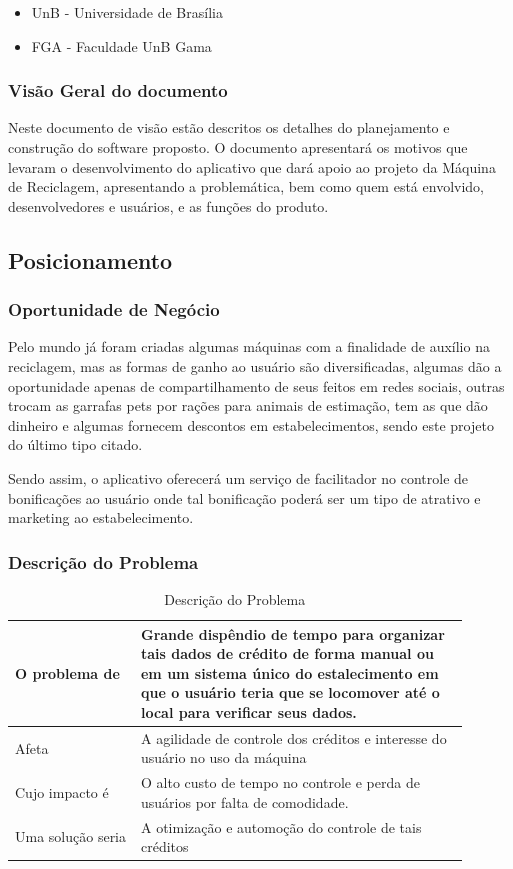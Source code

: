 \begin{itemize}
    \item UnB - Universidade de Brasília
    \item FGA - Faculdade UnB Gama
\end{itemize}

\subsubsection{Visão Geral do documento}
Neste documento de visão estão descritos os detalhes do planejamento e construção do software proposto. O documento apresentará os motivos que levaram o desenvolvimento do aplicativo que dará apoio ao projeto da Máquina de Reciclagem, apresentando a problemática, bem como quem está envolvido, desenvolvedores e usuários, e as funções do produto.

\subsection{Posicionamento}

\subsubsection{Oportunidade de Negócio}
Pelo mundo já foram criadas algumas máquinas com a finalidade de auxílio na reciclagem, mas as formas de ganho ao usuário são diversificadas, algumas dão a oportunidade apenas de compartilhamento de seus feitos em redes sociais, outras trocam as garrafas pets por rações para animais de estimação, tem as que dão dinheiro e algumas fornecem descontos em estabelecimentos, sendo este projeto do último tipo citado.

Sendo assim, o aplicativo oferecerá um serviço de facilitador no controle de bonificações ao usuário onde tal bonificação poderá ser um tipo de atrativo e marketing ao estabelecimento.

\subsubsection{Descrição do Problema}

\begin{table}[htp]
    \centering
    \caption{Descrição do Problema}
    \label{my-label}
    \begin{tabular}{|p{0.25\linewidth}|p{0.65\linewidth}|}
        \hline
        O problema de     & Grande dispêndio de tempo para organizar tais dados de crédito de forma manual ou em um sistema único do estalecimento em que o usuário teria que se locomover até o local para verificar seus dados. \\ \hline
        Afeta             & A agilidade de controle dos créditos e interesse do usuário no uso da máquina \\ \hline
        Cujo impacto é    & O alto custo de tempo no controle e perda de usuários por falta de comodidade. \\ \hline
        Uma solução seria & A otimização e automoção do controle de tais créditos \\ \hline
    \end{tabular}
\end{table}

